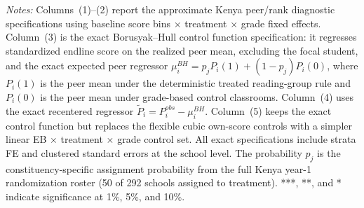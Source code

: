 \begin{table}[H]
\centering
\caption{Kenya Peer/Rank Diagnostics: Approximate vs. Exact Borusyak--Hull Specifications}
\label{tab:peer_effects_exact_kenya}
\scriptsize
{}
\par\smallskip
\begin{minipage}{0.94\textwidth}
\scriptsize
\setlength{\emergencystretch}{2em}
\textit{Notes:} Columns~(1)--(2) report the approximate Kenya peer/rank diagnostic specifications using baseline score bins $\times$ treatment $\times$ grade fixed effects. Column~(3) is the exact Borusyak--Hull control function specification: it regresses standardized endline score on the realized peer mean, excluding the focal student, and the exact expected peer regressor \(\mu_i^{BH} = p_j P_i(1) + (1-p_j) P_i(0)\), where \(P_i(1)\) is the peer mean under the deterministic treated reading-group rule and \(P_i(0)\) is the peer mean under grade-based control classrooms. Column~(4) uses the exact recentered regressor \(\tilde{P}_i = P_i^{obs} - \mu_i^{BH}\). Column~(5) keeps the exact control function but replaces the flexible cubic own-score controls with a simpler linear EB $\times$ treatment $\times$ grade control set. All exact specifications include strata FE and clustered standard errors at the school level. The probability \(p_j\) is the constituency-specific assignment probability from the full Kenya year-1 randomization roster (50 of 292 schools assigned to treatment). ***, **, and * indicate significance at 1\%, 5\%, and 10\%.
\end{minipage}
\end{table}
